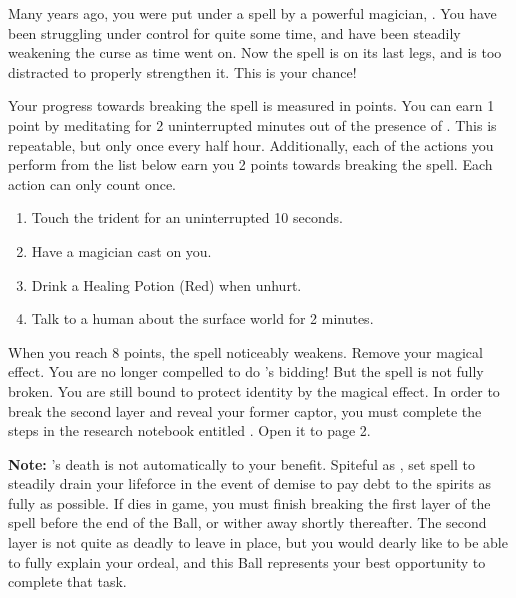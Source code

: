\documentclass[green]{NeptuneBall}
\begin{document}
\name{\gSpellBreak{}}


Many years ago, you were put under a spell by a powerful magician, \cWitch{}. You have been struggling under \cWitch{\their} control for quite some time, and have been steadily weakening the curse as time went on. Now the spell is on its last legs, and \cWitch{} is too distracted to properly strengthen it. This is your chance!

Your progress towards breaking the spell is measured in points. You can earn 1 point by meditating for 2 uninterrupted minutes out of the presence of \cWitch{}. This is repeatable, but only once every half hour. Additionally, each of the actions you perform from the list below earn you 2 points towards breaking the spell. Each action can only count once.

\begin{enumerate}
\item Touch the trident for an uninterrupted 10 seconds.
\item Have a magician cast \aLesserDispel{} on you.
\item Drink a Healing Potion (Red) when unhurt.
\item Talk to a human about the surface world for 2 minutes.
\end{enumerate}

When you reach 8 points, the spell noticeably weakens. Remove your \iEnslavementSpell{} magical effect. You are no longer compelled to do \cWitch{}'s bidding! But the spell is not fully broken. You are still bound to protect \cWitch{\their} identity by the \iIdentityProtectionSpell{} magical effect. In order to break the second layer and reveal your former captor, you must complete the steps in the research notebook entitled \nSpellBreakNotebook{}. Open it to page 2.

{\bf Note:} \cWitch{}'s death is not automatically to your benefit. Spiteful as \cWitch{\they} \cWitch{\are}, \cWitch{} set \cWitch{\their} spell to steadily drain your lifeforce in the event of \cWitch{\their} demise to pay \cWitch{\their} debt to the spirits as fully as possible. If \cWitch{} dies in game, you must finish breaking the first layer of the spell before the end of the Ball, or wither away shortly thereafter. The second layer is not quite as deadly to leave in place, but you would dearly like to be able to fully explain your ordeal, and this Ball represents your best opportunity to complete that task.
\end{document}
